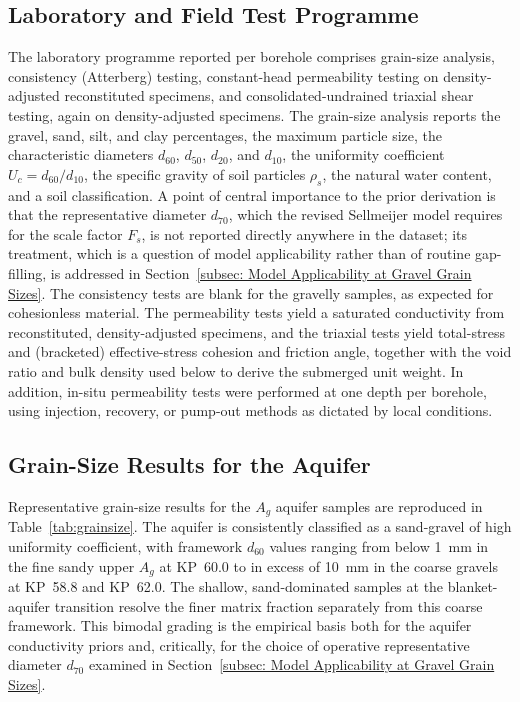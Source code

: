 \subsection{Laboratory and Field Test Programme}
\label{subsec: Laboratory and Field Test Programme}

The laboratory programme reported per borehole comprises grain-size analysis, consistency (Atterberg) testing, constant-head permeability testing on density-adjusted reconstituted specimens, and consolidated-undrained triaxial shear testing, again on density-adjusted specimens. The grain-size analysis reports the gravel, sand, silt, and clay percentages, the maximum particle size, the characteristic diameters $d_{60}$, $d_{50}$, $d_{20}$, and $d_{10}$, the uniformity coefficient $U_c = d_{60}/d_{10}$, the specific gravity of soil particles $\rho_s$, the natural water content, and a soil classification. A point of central importance to the prior derivation is that the representative diameter $d_{70}$, which the revised Sellmeijer model \parencite{sellmeijer_2011} requires for the scale factor $F_s$, is not reported directly anywhere in the dataset; its treatment, which is a question of model applicability rather than of routine gap-filling, is addressed in Section~\ref{subsec: Model Applicability at Gravel Grain Sizes}. The consistency tests are blank for the gravelly samples, as expected for cohesionless material. The permeability tests yield a saturated conductivity from reconstituted, density-adjusted specimens, and the triaxial tests yield total-stress and (bracketed) effective-stress cohesion and friction angle, together with the void ratio and bulk density used below to derive the submerged unit weight. In addition, in-situ permeability tests were performed at one depth per borehole, using injection, recovery, or pump-out methods as dictated by local conditions.

\subsection{Grain-Size Results for the Aquifer}
\label{subsec: Grain-Size Results for the Aquifer}

Representative grain-size results for the $A_g$ aquifer samples are reproduced in Table~\ref{tab:grainsize}. The aquifer is consistently classified as a sand-gravel of high uniformity coefficient, with framework $d_{60}$ values ranging from below 1~mm in the fine sandy upper $A_g$ at KP~60.0 to in excess of 10~mm in the coarse gravels at KP~58.8 and KP~62.0. The shallow, sand-dominated samples at the blanket-aquifer transition resolve the finer matrix fraction separately from this coarse framework. This bimodal grading is the empirical basis both for the aquifer conductivity priors and, critically, for the choice of operative representative diameter $d_{70}$ examined in Section~\ref{subsec: Model Applicability at Gravel Grain Sizes}.

